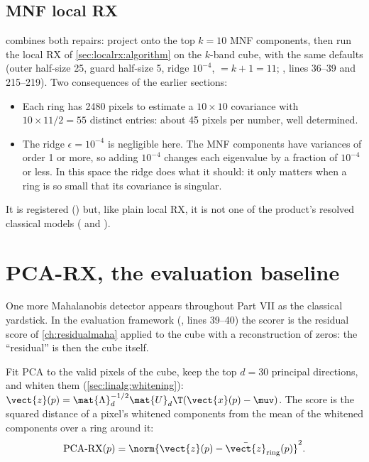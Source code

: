 \subsection{MNF local RX}

 combines both repairs: project onto the top $k = 10$ MNF components,
then run the local RX of \cref{sec:localrx:algorithm} on the $k$-band cube, with the same defaults
(outer half-size 25, guard half-size 5, ridge $10^{-4}$,  $= k + 1 = 11$;
, lines 36--39 and 215--219). Two consequences of the earlier
sections:
\begin{itemize}
  \item Each ring has 2480 pixels to estimate a $10\times10$ covariance with
    $10\times11/2 = 55$ distinct entries: about 45 pixels per number, well determined.
  \item The ridge $\epsilon = 10^{-4}$ is negligible here. The MNF components have variances of order
    1 or more, so adding $10^{-4}$ changes each eigenvalue by a fraction of $10^{-4}$ or less. In this
    space the ridge does what it should: it only matters when a ring is so small that its covariance
    is singular.
\end{itemize}
It is registered () but, like plain local RX, it is not one of the product's
resolved classical models ( and ).

\section{PCA-RX, the evaluation baseline}\label{sec:localrx:pcarx}

One more Mahalanobis detector appears throughout Part VII as the classical yardstick. In the
evaluation framework (, lines 39--40) the scorer  is the
residual score of \cref{ch:residualmaha} applied to the cube with a reconstruction of zeros: the
``residual'' is then the cube itself.

\begin{definition}[PCA-RX]
Fit PCA to the valid pixels of the cube, keep the top $d = 30$ principal directions, and whiten them
(\cref{sec:linalg:whitening}): $\vect{z}(p) = \mat{\Lambda}_d^{-1/2}\mat{U}_d\T(\vect{x}(p) - \muv)$. The
score is the squared distance of a pixel's whitened components from the mean of the whitened
components over a ring around it:
\begin{equation}\label{eq:localrx:pcarx}
\text{PCA-RX}(p) = \norm{\vect{z}(p) - \bar{\vect{z}}_{\text{ring}}(p)}^2 .
\end{equation}
\end{definition}

